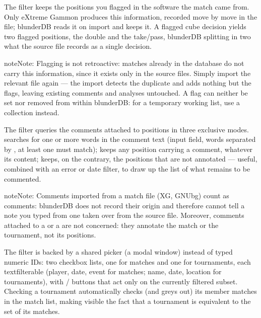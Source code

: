 \documentclass[letterpaper,10pt,english]{sphinxmanual}
\begin{document}
\sphinxAtStartPar
The  filter keeps the positions you flagged in the software the match came from. Only eXtreme Gammon produces this information, recorded move by move in the  file; blunderDB reads it on import and keeps it. A flagged cube decision yields two flagged positions, the double and the take/pass, blunderDB splitting in two what the source file records as a single decision.

\begin{sphinxadmonition}{note}{Note:}
\sphinxAtStartPar
Flagging is not retroactive: matches already in the database do not carry this information, since it exists only in the source files. Simply import the relevant  file again — the import detects the duplicate and adds nothing but the flags, leaving existing comments and analyses untouched. A flag can neither be set nor removed from within blunderDB: for a temporary working list, use a collection instead.
\end{sphinxadmonition}

\sphinxAtStartPar
The  filter queries the comments attached to positions in three exclusive modes.  searches for one or more words in the comment text (input field, words separated by \sphinxcode{\sphinxupquote{;}}, at least one must match);  keeps any position carrying a comment, whatever its content;  keeps, on the contrary, the positions that are not annotated — useful, combined with an error or date filter, to draw up the list of what remains to be commented.

\begin{sphinxadmonition}{note}{Note:}
\sphinxAtStartPar
Comments imported from a match file (XG, GNUbg) count as comments: blunderDB does not record their origin and therefore cannot tell a note you typed from one taken over from the source file. Moreover, comments attached to a  or a  are not concerned: they annotate the match or the tournament, not its positions.
\end{sphinxadmonition}

\sphinxAtStartPar
The  filter is backed by a shared picker (a modal window) instead of typed numeric IDs: two checkbox lists, one for matches and one for tournaments, each text\sphinxhyphen{}filterable (player, date, event for matches; name, date, location for tournaments), with  /  buttons that act only on the currently filtered subset. Checking a tournament automatically checks (and greys out) its member matches in the match list, making visible the fact that a tournament is equivalent to the set of its matches.
\end{document}
